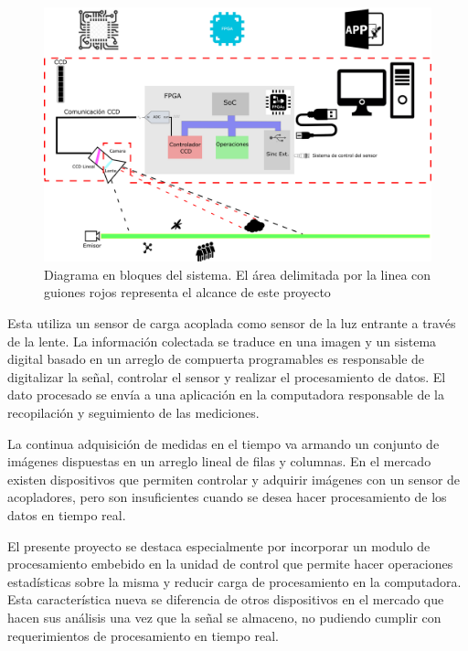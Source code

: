\documentclass[
11pt, %
codirector, %
]{charter}
\begin{document}
\begin{figure}[htpb]
\centering 
\includegraphics[width=.9\textwidth]{./Figuras/esquema_png.png}
\caption{Diagrama en bloques del sistema. El área delimitada por la linea con guiones rojos representa el alcance de este proyecto}
\label{fig:diagBloques}
\end{figure}


Esta utiliza un sensor de carga acoplada como sensor de la luz entrante a través de la lente. La información colectada se traduce en una imagen y un sistema digital basado en un arreglo de compuerta programables es responsable de digitalizar la señal, controlar el sensor y realizar el procesamiento de datos. El dato procesado se envía a una aplicación en la computadora responsable de la recopilación y seguimiento de las mediciones. 

La continua adquisición de medidas en el tiempo va armando un conjunto de imágenes dispuestas en un arreglo lineal de filas y columnas. En el mercado existen dispositivos que permiten controlar y adquirir imágenes con un sensor de acopladores, pero son insuficientes cuando se desea hacer procesamiento de los datos en tiempo real.

El presente proyecto se destaca especialmente por incorporar un modulo de procesamiento embebido en la unidad de control que permite hacer operaciones estadísticas sobre la misma y reducir carga de procesamiento en la computadora. Esta característica nueva se diferencia de otros dispositivos en el mercado que hacen sus análisis una vez que la señal se almaceno, no pudiendo cumplir con requerimientos de procesamiento en tiempo real.
\end{document}
